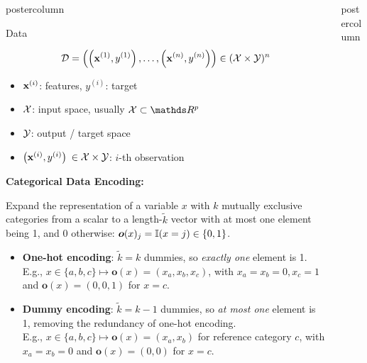 \documentclass{beamer}
\begin{document}
\begin{frame}[fragile]{}
\begin{columns}
\begin{column}{.31\textwidth}
\begin{beamercolorbox}[center]{postercolumn}
\begin{minipage}{.98\textwidth}
{\begin{myblock}{Data}

$$\mathcal{D} = \left( \left(\mathbf{x}^{(1)}, y^{(1)}\right), \ldots, \left(\mathbf{x}^{(n)}, y^{(n)}\right)\right) \in (\mathcal{X} \times \mathcal{Y})^n$$
\begin{itemize}[$\bullet$] 
  \setlength{\itemindent}{+.3in}
  \item $\mathbf{x}^{(i)}$: features, $y^{(i)}$: target
  \item $\mathcal{X}$: input space, usually $\Xspace \subset \R^p$
  \item $\mathcal{Y}$: output / target space
  \item \(\left(\mathbf{x}^{(i)}, y^{(i)}\right)\) $\in \mathcal{X}\times \mathcal{Y}$:  \(i\)-th observation
\end{itemize}

\begin{codebox} 
\textbf{Categorical Data Encoding:}
\end{codebox}
Expand the representation of a variable $x$
with $k$ mutually exclusive categories from a scalar 
to a length-$\tilde k$ vector with at most one 
element being 1, and 0 otherwise: $\bm{o}(x)_j =\mathbb{I}(x = j) \in \{0,1\}$.

\begin{itemize}[$\bullet$] 
  \setlength{\itemindent}{+.3in}
    \item \textbf{One-hot encoding}: $\tilde k = k$ dummies, so \textit{exactly 
    one} element is 1. \\
    E.g., $x \in \{ a, b, c\} \mapsto \bm{o}(x) = (x_a, x_b, x_c)$, with 
    $x_a = x_b = 0, x_c = 1$ and $\bm{o}(x) = (0, 0, 1)$ for $x = c$.
    \item \textbf{Dummy encoding}: $\tilde k = k - 1$ dummies, so 
    \textit{at most one} element is 1, removing the redundancy of one-hot 
    encoding. \\
    E.g., $x \in \{ a, b, c\} \mapsto \bm{o}(x) = (x_a, x_b)$ for reference 
    category $c$, with $x_a = x_b = 0$ and $\bm{o}(x) = (0, 0)$ for $x = c$.
\end{itemize} 

\end{myblock}\vfill
				}
			\end{minipage}
		\end{beamercolorbox}
	\end{column}
	

\begin{column}{.31\textwidth}
\begin{beamercolorbox}[center]{postercolumn}
\begin{minipage}{.98\textwidth}
\parbox[t][\columnheight]{\textwidth}{

}
\end{minipage}
\end{beamercolorbox}
\end{column}
\end{columns}
\end{frame}
\end{document}
